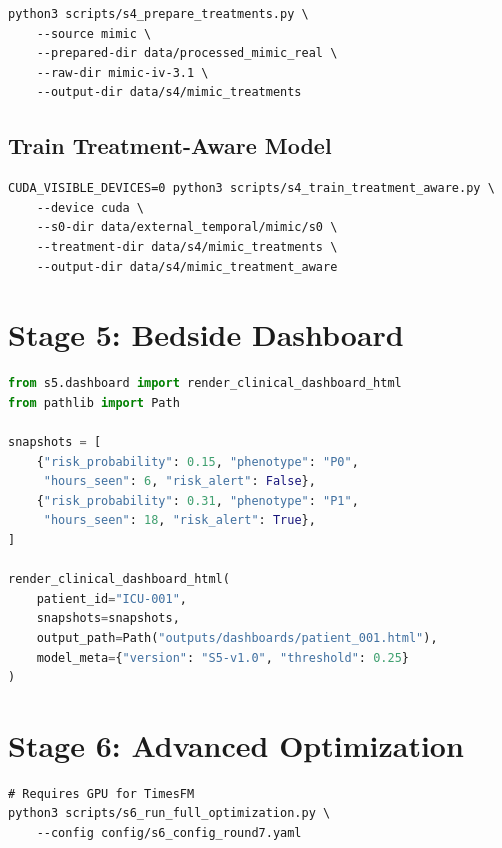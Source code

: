 \documentclass[11pt,a4paper]{article}
\begin{document}
\begin{lstlisting}
python3 scripts/s4_prepare_treatments.py \
    --source mimic \
    --prepared-dir data/processed_mimic_real \
    --raw-dir mimic-iv-3.1 \
    --output-dir data/s4/mimic_treatments
\end{lstlisting}

\subsection{Train Treatment-Aware Model}

\begin{lstlisting}
CUDA_VISIBLE_DEVICES=0 python3 scripts/s4_train_treatment_aware.py \
    --device cuda \
    --s0-dir data/external_temporal/mimic/s0 \
    --treatment-dir data/s4/mimic_treatments \
    --output-dir data/s4/mimic_treatment_aware
\end{lstlisting}

\section{Stage 5: Bedside Dashboard}

\begin{lstlisting}[language=Python,title={\faCode\hspace{0.5em}Python}]
from s5.dashboard import render_clinical_dashboard_html
from pathlib import Path

snapshots = [
    {"risk_probability": 0.15, "phenotype": "P0", 
     "hours_seen": 6, "risk_alert": False},
    {"risk_probability": 0.31, "phenotype": "P1", 
     "hours_seen": 18, "risk_alert": True},
]

render_clinical_dashboard_html(
    patient_id="ICU-001",
    snapshots=snapshots,
    output_path=Path("outputs/dashboards/patient_001.html"),
    model_meta={"version": "S5-v1.0", "threshold": 0.25}
)
\end{lstlisting}

\section{Stage 6: Advanced Optimization}

\begin{lstlisting}
# Requires GPU for TimesFM
python3 scripts/s6_run_full_optimization.py \
    --config config/s6_config_round7.yaml
\end{lstlisting}
\end{document}

